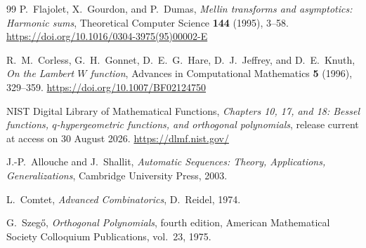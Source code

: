 \documentclass[11pt,oneside]{article}
\theoremstyle{definition}
\theoremstyle{remark}
\begin{document}
\begin{thebibliography}{99}
P.~Flajolet, X.~Gourdon, and P.~Dumas,
\emph{Mellin transforms and asymptotics: Harmonic sums},
Theoretical Computer Science \textbf{144} (1995), 3--58.
\url{https://doi.org/10.1016/0304-3975(95)00002-E}

R.~M.~Corless, G.~H.~Gonnet, D.~E.~G.~Hare, D.~J.~Jeffrey, and D.~E.~Knuth,
\emph{On the Lambert $W$ function},
Advances in Computational Mathematics \textbf{5} (1996), 329--359.
\url{https://doi.org/10.1007/BF02124750}

NIST Digital Library of Mathematical Functions,
\emph{Chapters 10, 17, and 18: Bessel functions, $q$-hypergeometric functions,
and orthogonal polynomials},
release current at access on 30 August 2026.
\url{https://dlmf.nist.gov/}

J.-P.~Allouche and J.~Shallit,
\emph{Automatic Sequences: Theory, Applications, Generalizations},
Cambridge University Press, 2003.

L.~Comtet,
\emph{Advanced Combinatorics},
D.~Reidel, 1974.

G.~Szeg\H{o},
\emph{Orthogonal Polynomials}, fourth edition,
American Mathematical Society Colloquium Publications, vol.~23, 1975.

\end{thebibliography}
\end{document}
